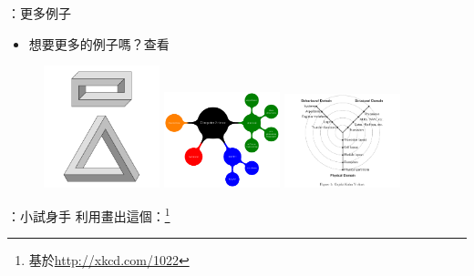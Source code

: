 \documentclass{beamer}
\begin{document}
\begin{frame}[fragile]{\insertsection：更多例子}
\begin{itemize}
\item 想要更多\tikzname{}的例子嗎？查看 
\end{itemize}
\begin{figure}
\href{http://texample.net/tikz/examples/escher-brick-penrose-triangle/}{%
  \includegraphics[width=0.3\textwidth]{escher-brick-penrose-triangle}}
\href{http://texample.net/tikz/examples/computer-science-mindmap/}{%
  \includegraphics[width=0.3\textwidth]{computer-science-mindmap}}
\href{http://texample.net/tikz/examples/gajski-kuhn-y-chart/}{%
  \includegraphics[width=0.3\textwidth]{gajski-kuhn-y-chart}}
\end{figure}
\end{frame}

\begin{frame}[fragile]{\insertsection：小試身手}
利用\tikzname{}畫出這個：\footnote{基於\url{http://xkcd.com/1022}}
\begin{figure}

\end{figure}
\end{frame}
\end{document}
